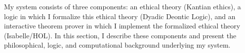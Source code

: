 %
\begin{isabellebody}%
%
%
\isadelimtheory
%
\endisadelimtheory
%
\isatagtheory
%
\endisatagtheory
{\isafoldtheory}%
%
\isadelimtheory
%
\endisadelimtheory
%
\isadelimdocument
%
\endisadelimdocument
%
\isatagdocument
%
\isamarkuptrue%
%
\endisatagdocument
{\isafolddocument}%
%
\isadelimdocument
%
\endisadelimdocument
%
\begin{isamarkuptext}%
My system consists of three components: an ethical theory (Kantian ethics), a logic in which
I formalize this ethical theory (Dyadic Deontic Logic), and an interactive theorem prover in which I 
implement the formalized ethical theory (Isabelle/HOL). In this section, I describe these components and 
present the philosophical, logic, and computational background underlying my system. 


\end{isamarkuptext}
\end{isabellebody}
